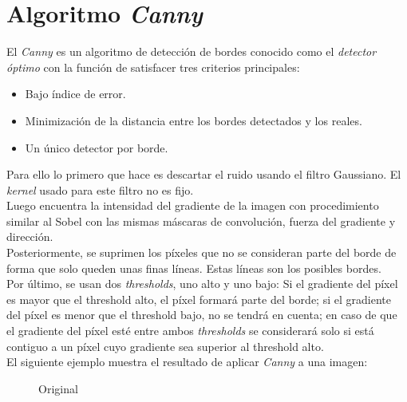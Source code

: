 \section{Algoritmo \emph{Canny}}\label{tecnica:canny}
El \emph{Canny} \emph{\citep*[A computational approach to edge
  detection]{canny1986computational}}
\emph{\citep*[Canny]{opencv_book-bib}} \emph{\citep*[5.1 Edge
  Tracking]{toennies2012guide}} es un algoritmo de detección de bordes
conocido como el \emph{detector óptimo} con la función de satisfacer
tres criterios principales:
\begin{itemize}
\item Bajo índice de error.
\item Minimización de la distancia entre los bordes detectados y los
  reales.
\item Un único detector por borde.
\end{itemize}
Para ello lo primero que hace es descartar el ruido usando el filtro
Gaussiano.
El \emph{kernel} usado para este filtro no es fijo.\\
Luego encuentra la intensidad del gradiente de la imagen con
procedimiento similar al Sobel con las mismas máscaras de convolución,
fuerza del gradiente y dirección.\\
Posteriormente, se suprimen los píxeles que no se consideran parte del
borde de forma que solo queden unas finas líneas. Estas líneas son los posibles bordes.\\
Por último, se usan dos \emph{thresholds}, uno alto y uno bajo: Si el
gradiente del píxel es mayor que el threshold alto, el píxel formará
parte del borde; si el gradiente del píxel es menor que el threshold
bajo, no se tendrá en cuenta; en caso de que el gradiente del píxel
esté entre ambos \emph{thresholds} se considerará solo si está
contiguo a un píxel cuyo gradiente sea superior al threshold alto.\\
El siguiente ejemplo muestra el resultado de aplicar \emph{Canny} a
una imagen:

\begin{figure}[H]
  \caption{Original}
  \centering \setlength\fboxsep{0pt} \setlength\fboxrule{0.5pt}
\end{figure}

